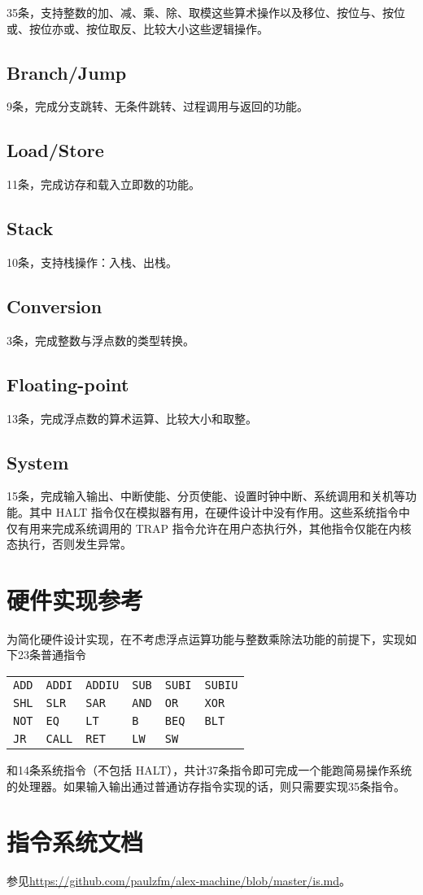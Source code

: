 \documentclass[11pt, a4paper]{article}
\renewcommand{\t}{\texttt}
\begin{document}
35条，支持整数的加、减、乘、除、取模这些算术操作以及移位、按位与、按位或、按位亦或、按位取反、比较大小这些逻辑操作。

\subsection{Branch/Jump}

9条，完成分支跳转、无条件跳转、过程调用与返回的功能。

\subsection{Load/Store}

11条，完成访存和载入立即数的功能。

\subsection{Stack}

10条，支持栈操作：入栈、出栈。

\subsection{Conversion}

3条，完成整数与浮点数的类型转换。

\subsection{Floating-point}

13条，完成浮点数的算术运算、比较大小和取整。

\subsection{System}

15条，完成输入输出、中断使能、分页使能、设置时钟中断、系统调用和关机等功能。其中 HALT 指令仅在模拟器有用，在硬件设计中没有作用。这些系统指令中仅有用来完成系统调用的 TRAP 指令允许在用户态执行外，其他指令仅能在内核态执行，否则发生异常。

\section{硬件实现参考}

为简化硬件设计实现，在不考虑浮点运算功能与整数乘除法功能的前提下，实现如下23条普通指令

\begin{center}
\begin{tabular}{llllll}
    \t{ADD} & \t{ADDI} & \t{ADDIU} & \t{SUB} & \t{SUBI} & \t{SUBIU} \\
    \t{SHL} & \t{SLR} & \t{SAR} & \t{AND} & \t{OR} & \t{XOR} \\
    \t{NOT} & \t{EQ} & \t{LT} & \t{B} & \t{BEQ} & \t{BLT} \\
    \t{JR } & \t{CALL} & \t{RET} & \t{LW} & \t{SW} & \\
\end{tabular}
\end{center}
和14条系统指令（不包括 HALT），共计37条指令即可完成一个能跑简易操作系统的处理器。如果输入输出通过普通访存指令实现的话，则只需要实现35条指令。

\section{指令系统文档}

参见\url{https://github.com/paulzfm/alex-machine/blob/master/is.md}。
\end{document}
